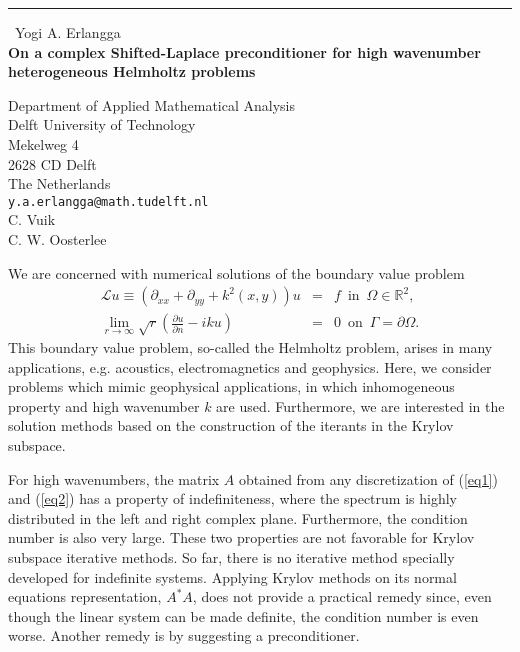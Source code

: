 \documentclass{report}
\begin{document}
\begin{center}
\rule{6in}{1pt} \
{\large Yogi A. Erlangga \\
{\bf On a complex Shifted-Laplace preconditioner for high wavenumber heterogeneous Helmholtz problems}}

Department of Applied Mathematical Analysis \\ Delft University of Technology \\ Mekelweg 4 \\ 2628 CD Delft \\ The Netherlands
\\
{\tt y.a.erlangga@math.tudelft.nl}\\
C. Vuik\\
C. W. Oosterlee\end{center}

We are concerned with numerical solutions of the boundary value problem
\begin{eqnarray}
\mathcal{L} u \equiv \left( \partial_{xx} + \partial_{yy} + k^2(x,y) \right) u
&=& f \, \, \, \text{in} \, \, \, \Omega \in \mathbb{R}^2, \label{eq1}\\
\lim_{r \rightarrow \infty} \sqrt{r} \left(\frac{\partial u}{\partial n}
- i k u \right) &=& 0 \, \, \, \text{on} \, \, \, \Gamma = \partial \Omega. \label{eq2}
\end{eqnarray}
This boundary value problem, so-called the Helmholtz problem, arises in
many applications, e.g. acoustics, electromagnetics and geophysics. Here,
we consider problems which mimic geophysical applications, in which
inhomogeneous property and high wavenumber $k$ are used. Furthermore, we
are interested in the solution methods based on the construction of the
iterants in the Krylov subspace.

For high wavenumbers, the matrix $A$ obtained from any discretization of
(\ref{eq1}) and (\ref{eq2}) has a property of indefiniteness, where the
spectrum is highly distributed in the left and right complex plane.
Furthermore, the condition number is also very large. These two
properties are not favorable for Krylov subspace iterative methods. So
far, there is no iterative method specially developed for indefinite
systems. Applying Krylov methods on its normal equations representation,
$A^*A$, does not provide a practical remedy since, even though the linear
system can be made definite, the condition number is even worse. Another
remedy is by suggesting a preconditioner.
\end{document}

